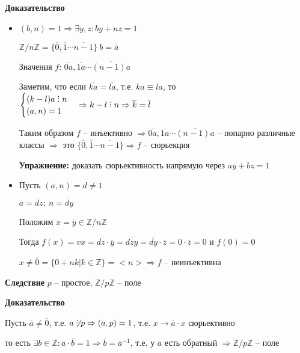 \documentclass[14pt, letter paper]{article}
\DeclareRobustCommand{\divby}{%
  \mathrel{\text{\vbox{\baselineskip.65ex\lineskiplimit0pt\hbox{.}\hbox{.}\hbox{.}}}}%
}
\begin{document}
\begin{center}
    \textbf{Доказательство}
\end{center}

\begin{itemize}
    \item $(b,n) = 1 \Rightarrow \exists y, z: by + nz = 1$

    $\mathds{Z}/n\mathds{Z} = \{ \overline{0}, \overline{1} \cdots \overline{n-1} \}\ b = \overline{a}$

    Значения $f$: $\overline{0a}, \overline{1a} \cdots \overline{(n-1)a}$

    Заметим, что если $\overline{ka} = \overline{la}$, т.е. $ka \equiv la$, то $\begin{cases}
        (k-l)a \divby n \\
        (a,n) = 1
    \end{cases} \Rightarrow k-l \divby n \Rightarrow \overline{k} = \overline{l}$

    Таким образом $f$ -- инъективно $\Rightarrow \overline{0a}, \overline{1a} \cdots \overline{(n-1)a}$ -- попарно различные классы $\Rightarrow$ это $\{ \overline{0}, \overline{1} \cdots \overline{n-1}\} \Rightarrow f$ -- сюрьекция
    
    \textbf{Упражнение:} доказать сюрьективность напрямую через $ay + bz = 1$

    \item Пусть $(a,n) = d \neq 1$

    $a = dz;\ n = dy$

    Положим $x = \overline{y} \in \mathds{Z}/n\mathds{Z}$

    Тогда $f(x) = vx = \overline{dz} \cdot \overline{y} = \overline{dzy} = \overline{dy} \cdot \overline{z} = 0 \cdot \overline{z} = 0$ и $f(0) = 0$

    $x \neq \overline{0} = \{ 0 + nk | k \in \mathds{Z}\} = <n> \Rightarrow f$ -- неинъективна
\end{itemize}

\textbf{Следствие} $p$ -- простое, $\mathds{Z}/p\mathds{Z}$ -- поле

\begin{center}
    \textbf{Доказательство}
\end{center}

Пусть $\overline{a} \neq \overline{0}$, т.е. $a \not\divby p \Rightarrow (a,p) = 1$, т.е. $x \rightarrow \overline{a} \cdot x$ сюрьективно

то есть $\exists b \in \mathds{Z} : \overline{a} \cdot \overline{b} = 1 \Rightarrow \overline{b} = \overline{a}^{-1}$, т.е. у $\overline{a}$ есть обратный $\Rightarrow \mathds{Z}/p\mathds{Z}$ -- поле
\end{document}
